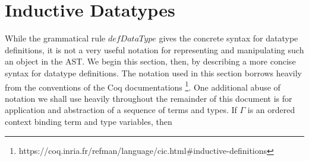 \documentclass{article}
\begin{document}


\newpage
\section{Inductive Datatypes}
\label{sec:ind-data}

While the grammatical rule $defDataType$ gives the concrete syntax for datatype
definitions, it is not a very useful notation for representing and manipulating
such an object in the AST. We begin this section, then, by describing a more
concise syntax for datatype definitions. The notation used in this section
borrows heavily from the conventions of the Coq documentations
\footnote{https://coq.inria.fr/refman/language/cic.html\#inductive-definitions}.
One additional abuse of notation we shall use heavily throughout the remainder
of this document is for application and abstraction of a sequence of terms and
types. If $\Gamma$ is an ordered context binding term and type variables, then
\end{document}
